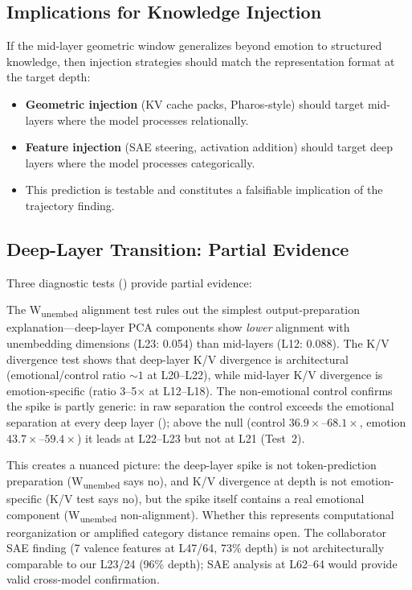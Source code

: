 \documentclass[11pt,a4paper]{article}
\begin{document}
\subsection{Implications for Knowledge Injection}

If the mid-layer geometric window generalizes beyond emotion to
structured knowledge, then injection strategies should match the
representation format at the target depth:

\begin{itemize}[nosep]
    \item \textbf{Geometric injection} (KV cache packs, Pharos-style)
          should target mid-layers where the model processes relationally.
    \item \textbf{Feature injection} (SAE steering, activation addition)
          should target deep layers where the model processes
          categorically.
    \item This prediction is testable and constitutes a falsifiable
          implication of the trajectory finding.
\end{itemize}

\subsection{Deep-Layer Transition: Partial Evidence}
\label{sec:future}

Three diagnostic tests () provide partial evidence:

The W\textsubscript{unembed} alignment test rules out the simplest
output-preparation explanation---deep-layer PCA components show
\emph{lower} alignment with unembedding dimensions (L23: 0.054) than
mid-layers (L12: 0.088). The K/V divergence test shows that deep-layer
K/V divergence is architectural (emotional/control ratio ${\sim}1$ at
L20--L22), while mid-layer K/V divergence is emotion-specific (ratio
3--5$\times$ at L12--L18). The non-emotional control confirms the spike is
partly generic: in raw separation the control exceeds the emotional
separation at every deep layer (); above the null
(control $36.9\times$--$68.1\times$, emotion $43.7\times$--$59.4\times$)
it leads at L22--L23 but not at L21 (Test~2).

This creates a nuanced picture: the deep-layer spike is not
token-prediction preparation (W\textsubscript{unembed} says no), and K/V
divergence at depth is not emotion-specific (K/V test says no), but the
spike itself contains a real emotional component
(W\textsubscript{unembed} non-alignment). Whether this
represents computational reorganization or amplified category distance
remains open. The collaborator SAE finding (7 valence features at
L47/64, 73\% depth) is not architecturally comparable to our L23/24
(96\% depth); SAE analysis at L62--64 would provide valid cross-model
confirmation.
\end{document}
